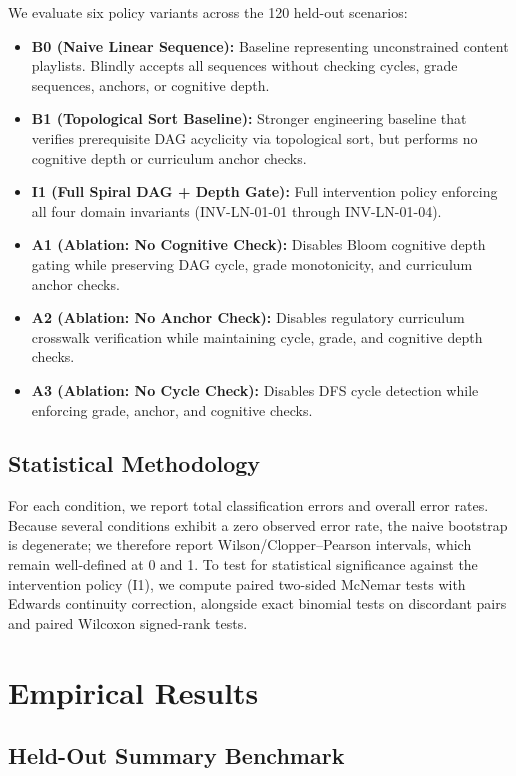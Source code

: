 \documentclass[11pt,a4paper]{article}
\begin{document}
We evaluate six policy variants across the 120 held-out scenarios:
\begin{itemize}
    \item \textbf{B0 (Naive Linear Sequence):} Baseline representing unconstrained content playlists. Blindly accepts all sequences without checking cycles, grade sequences, anchors, or cognitive depth.
    \item \textbf{B1 (Topological Sort Baseline):} Stronger engineering baseline that verifies prerequisite DAG acyclicity via topological sort, but performs no cognitive depth or curriculum anchor checks.
    \item \textbf{I1 (Full Spiral DAG + Depth Gate):} Full intervention policy enforcing all four domain invariants (INV-LN-01-01 through INV-LN-01-04).
    \item \textbf{A1 (Ablation: No Cognitive Check):} Disables Bloom cognitive depth gating while preserving DAG cycle, grade monotonicity, and curriculum anchor checks.
    \item \textbf{A2 (Ablation: No Anchor Check):} Disables regulatory curriculum crosswalk verification while maintaining cycle, grade, and cognitive depth checks.
    \item \textbf{A3 (Ablation: No Cycle Check):} Disables DFS cycle detection while enforcing grade, anchor, and cognitive checks.
\end{itemize}

\subsection{Statistical Methodology}
\label{sec:statistics}

For each condition, we report total classification errors and overall error rates. Because several conditions exhibit a zero observed error rate, the naive bootstrap is degenerate; we therefore report Wilson/Clopper--Pearson intervals, which remain well-defined at 0 and 1. To test for statistical significance against the intervention policy (I1), we compute paired two-sided McNemar tests with Edwards continuity correction, alongside exact binomial tests on discordant pairs and paired Wilcoxon signed-rank tests.

\section{Empirical Results}

\subsection{Held-Out Summary Benchmark}
\end{document}
